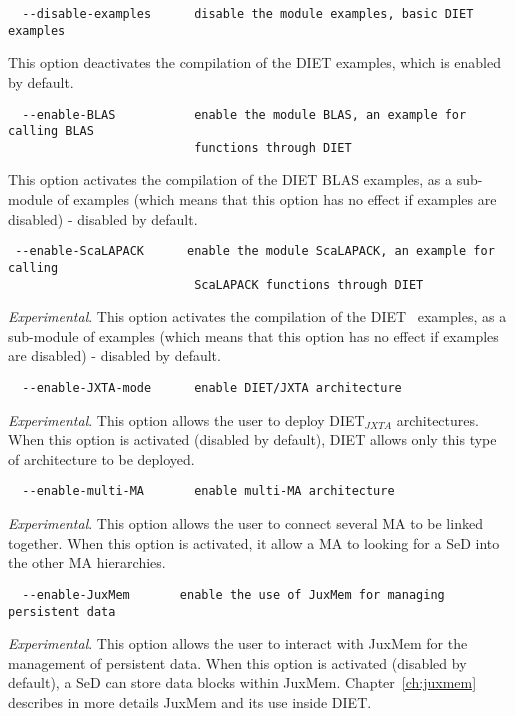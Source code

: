 {\footnotesize
\begin{verbatim}
  --disable-examples      disable the module examples, basic DIET examples
\end{verbatim}
}
\noindent This option deactivates the compilation of the DIET
examples, which is enabled by default.

{\footnotesize
\begin{verbatim}
  --enable-BLAS           enable the module BLAS, an example for calling BLAS
                          functions through DIET
\end{verbatim}
}
\noindent This option activates the compilation of the DIET BLAS
examples, as a sub-module of examples (which means that this option
has no effect if examples are disabled) - disabled by default.


{\footnotesize
\begin{verbatim}
 --enable-ScaLAPACK      enable the module ScaLAPACK, an example for calling
                          ScaLAPACK functions through DIET
\end{verbatim}
}
\noindent \textit{Experimental}.  This option activates the
compilation of the DIET \scalapack\ examples, as a sub-module of
examples (which means that this option has no effect if examples are
disabled) - disabled by default.

{\footnotesize
\begin{verbatim}
  --enable-JXTA-mode      enable DIET/JXTA architecture
\end{verbatim}
}
\noindent \textit{Experimental}.  This option allows the user to
deploy DIET$_{JXTA}$ architectures.  When this option is activated
(disabled by default), DIET allows only this type of architecture to
be deployed.

\label{sec:multimainstall}
{\footnotesize
\begin{verbatim}
  --enable-multi-MA       enable multi-MA architecture
\end{verbatim}
}
\noindent \textit{Experimental}.  This option allows the user to
connect several MA to be linked together. When this option is
activated, it allow a MA to looking for a SeD into the other MA
hierarchies.

{\footnotesize
\begin{verbatim}
  --enable-JuxMem       enable the use of JuxMem for managing persistent data
\end{verbatim}
}
\noindent \textit{Experimental}.  This option allows the user to
interact with JuxMem for the management of persistent data. When
this option is activated (disabled by default), a SeD can store data
blocks within JuxMem. Chapter~\ref{ch:juxmem} describes in more
details JuxMem and its use inside DIET.

